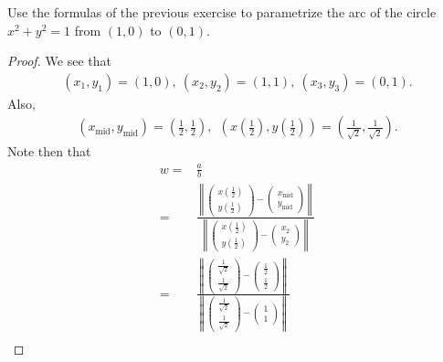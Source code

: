 \begin{exercise}{17}
    Use the formulas of the previous exercise to parametrize the arc of the circle $x^2 + y^2 = 1$ from $(1,0)$ to $(0,1)$.
\end{exercise}
\begin{proof}
We see that
\begin{align*}
    (x_1,y_1) = (1,0),~(x_2,y_2) = (1,1),~(x_3,y_3) = (0,1).
\end{align*}
Also,
\begin{align*}
    (x_{\text{mid}}, y_{\text{mid}}) 
    = \left(\frac{1}{2}, \frac{1}{2}\right),~~\left(x\left(\frac{1}{2}\right), y\left(\frac{1}{2}\right)\right) 
    = \left(\frac{1}{\sqrt{2}},\frac{1}{\sqrt{2}}\right).
\end{align*}
Note then that
\begin{align*}
    w
    =& \frac{a}{b}\\
    =& \frac{\left\|\left(\begin{array}{c} x\left(\frac{1}{2}\right)\\ y\left(\frac{1}{2}\right)\end{array}\right) 
    - \left(\begin{array}{c} x_{\text{mid}}\\ y_{\text{mid}}\end{array}\right)\right\|}{\left\|\left(\begin{array}{c} x\left(\frac{1}{2}\right)\\ y\left(\frac{1}{2}\right)\end{array}\right) 
    - \left(\begin{array}{c} x_2\\ y_2\end{array}\right)\right\|}\\
    =& \frac{\left\|\left(\begin{array}{c} \frac{1}{\sqrt{2}}\\ \frac{1}{\sqrt{2}}\end{array}\right) 
    - \left(\begin{array}{c} \frac{1}{2}\\ \frac{1}{2}\end{array}\right)\right\|}{\left\|\left(\begin{array}{c} \frac{1}{\sqrt{2}}\\ \frac{1}{\sqrt{2}}\end{array}\right) 
    - \left(\begin{array}{c} 1\\ 1\end{array}\right)\right\|}\\

\end{align*}
\end{proof}
